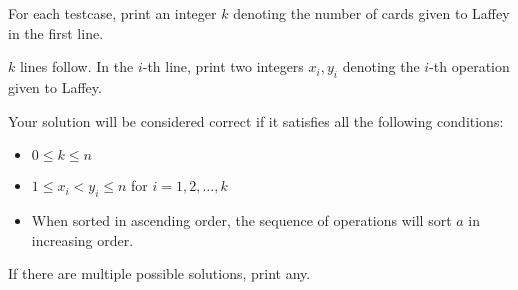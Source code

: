 For each testcase, print an integer $k$ denoting the number of cards given to Laffey in the first line.

$k$ lines follow.
In the $i$-th line, print two integers $x_i,y_i$ denoting the $i$-th operation given to Laffey.

Your solution will be considered correct if it satisfies all the following conditions:
\begin{itemize}
    \item $0 \leq k \leq n$
    \item $1 \leq x_i < y_i \leq n$ for $i = 1,2,\ldots,k$
    \item When sorted in ascending order, the sequence of operations will sort $a$ in increasing order.
\end{itemize}
If there are multiple possible solutions, print any.